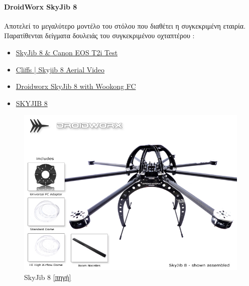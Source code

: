 \documentclass[a4paper, 12pt, twoside]{report}
\begin{document}
{{{{{{			\paragraph{DroidWorx SkyJib 8}{Αποτελεί το μεγαλύτερο μοντέλο του στόλου που διαθέτει η συγκεκριμένη εταιρία. Παρατίθενται δείγματα δουλειάς του συγκεκριμένου οχταπτέρου :
				\begin{itemize}
					\item \href{http://www.youtube.com/watch?v=1v4nffpEJKk}{SkyJib 8 \& Canon EOS T2i Test}
					\item \href{http://www.youtube.com/watch?v=eKXqiZfgXcQ}{Cliffs | Skyjib 8 Aerial Video}
					\item \href{https://vimeo.com/29674297}{Droidworx SkyJib 8 with Wookong FC}
					\item \href{https://vimeo.com/28055188}{SKYJIB 8}
				\end{itemize}
			}
			\begin{figure}[hp]
					\centering
					\includegraphics[scale=0.50]{DroidWrox_Skyjib8.png}
					\caption{SkyJib 8 \href{http://mikrokopter.altigator.com/images/droidworx/SkyJib-8b.jpg}{[πηγή]}}
					\label{φωτ:Cinestar 8}
			\end{figure}

			\begin{landscape}	
			\setlength\LTleft{0pt}            %
			\setlength\LTright{0pt}           %
	

\end{landscape}}}}}}}
\end{document}
